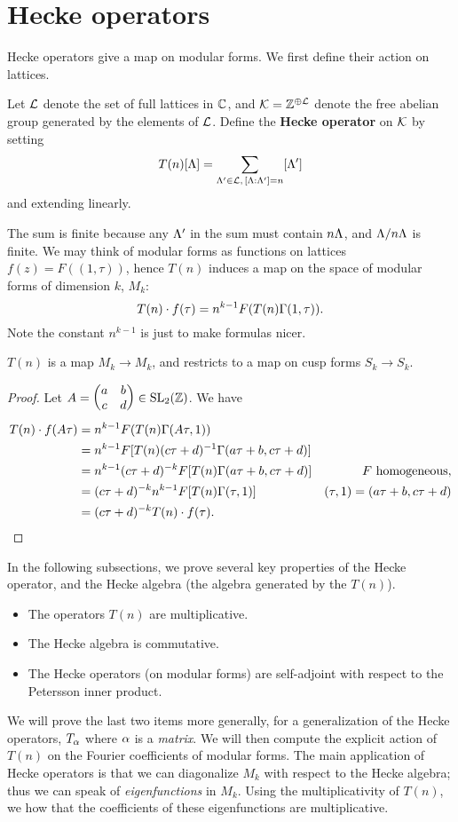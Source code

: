 \section{Hecke operators}
Hecke operators give a map on modular forms. We first define their action on lattices.
\begin{df}
Let $\cal L$ denote the set of full lattices in $\C$, and $\cal K=\Z^{\opl \cal L}$ denote the free abelian group generated by the elements of $\cal L$. Define the \textbf{Hecke operator} on $\cal K$ by setting
\[
T(n)[\La]=\sum_{\La'\in \cal L,\,[\La:\La']=n}[\La']
\]
and extending linearly.
\end{df}
The sum is finite because any $\La'$ in the sum must contain $n\La$, and $\La/n\La$ is finite. We may think of modular forms as functions on lattices $f(z)=F((1,\tau))$, hence $T(n)$ induces a map on the space of modular forms of dimension $k$, $M_k$:
\[
T(n)\cdot f(\tau)=n^{k-1}F(T(n)\Ga(1,\tau)).
\]
Note the constant $n^{k-1}$ is just to make formulas nicer.

\begin{pr}
$T(n)$ is a map $M_k\to M_k$, and restricts to a map on cusp forms $S_k\to S_k$.
\end{pr}
\begin{proof}
Let $A=\matt abcd\in \SL_2(\Z)$. We have
\begin{align*}
T(n)\cdot f(A\tau)&=n^{k-1}F(T(n)\Ga(A\tau,1))\\
&=n^{k-1}F[T(n)(c\tau+d)^{-1}\Ga(a\tau+b,c\tau+d)]\\
&=n^{k-1}(c\tau+d)^{-k}F[T(n)\Ga(a\tau+b,c\tau+d)]&F\text{ homogeneous},\\
&=(c\tau+d)^{-k}n^{k-1}F[T(n) \Ga(\tau,1)]&(\tau, 1)=(a\tau+b,c\tau+d)\\
&=(c\tau+d)^{-k} T(n)\cdot f(\tau).
\end{align*}
\end{proof}
In the following subsections, we prove several key properties of the Hecke operator, and the Hecke algebra (the algebra generated by the $T(n)$).
\begin{itemize}
\item
The operators $T(n)$ are multiplicative.
\item
The Hecke algebra is commutative.
\item
The Hecke operators (on modular forms) are self-adjoint with respect to the Petersson inner product.
\end{itemize}
We will prove the last two items more generally, for a generalization of the Hecke operators, $T_{\al}$ where $\al$ is a {\it matrix}. We will then compute the explicit action of $T(n)$ on the Fourier coefficients of modular forms. The main application of Hecke operators is that we can diagonalize $M_k$ with respect to the Hecke algebra; thus we can speak of {\it eigenfunctions} in $M_k$. Using the multiplicativity of $T(n)$, we how that the coefficients of these eigenfunctions are multiplicative.
